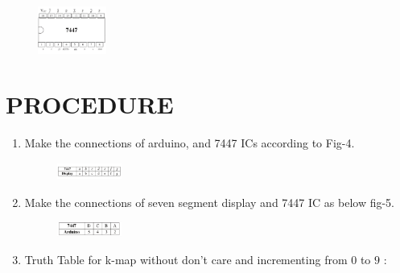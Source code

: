 \documentclass[conference]{IEEEtran}
\begin{document}
\begin{figure}[h]                           
\centering                                 
\includegraphics[width=0.2\textwidth]{fig2.jpg }                                           
\caption{\label{fig-2:Gates}}               
\end{figure}

\section{PROCEDURE}


\begin{enumerate}

\item Make the connections of arduino, and  7447 ICs according to Fig-4.
	\begin{figure}[h] 
	\centering 
	\includegraphics[width=0.2\textwidth]{fig3.jpg  }
	\caption{\label{fig-4:Gates}}    
\end{figure}



\item Make the connections of seven segment display and 7447 IC as below fig-5.

\begin{figure}[h]                           
\centering                                 
\includegraphics[width=0.2\textwidth]{fig4.jpg    }                                           
\caption{\label{fig-5:Gates}}               
\end{figure}


\item {Truth Table for k-map without don't care and incrementing from $0$ to $9$ :  }


\end{enumerate}
\end{document}
